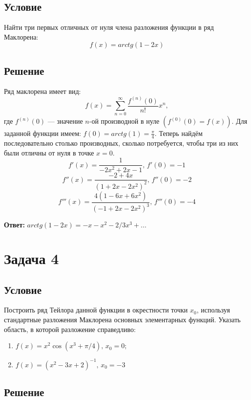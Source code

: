 \documentclass[12pt]{article}
\begin{document}
	\subsection*{Условие}
	
	Найти три первых отличных от нуля члена разложения функции в ряд Маклорена:
	$$ f(x) = arctg(1-2x) $$
	\subsection*{Решение}

	Ряд маклорена имеет вид:
	$$ f(x) = \sum_{n=0}^\infty \frac{f^{(n)}(0)}{n!} x^n ,$$
	где $ f^{(n)}(0) $ --- значение $ n $-ой производной в нуле $ (f^{(0)}(0)= f(x) )$. Для заданной функции имеем: $ f(0) = arctg(1) = \frac{\pi}{4} $. Теперь найдём последовательно столько производных, сколько потребуется, чтобы три из них были отличны от нуля в точке $ x = 0 $.
	$$ f'(x) = \frac{1}{- 2 x^2 + 2 x -1 }, \, f'(0) = - 1 $$
	$$ f''(x) = \frac{-2 + 4 x}{(1 + 2 x - 2 x^2)^2}, \, f''(0) = - 2 $$
	$$ f'''(x) = \frac{4 (1 - 6 x + 6 x^2)}{(-1 + 2 x - 2 x^2)^3}, \, f'''(0) = - 4 $$

	\hspace{200pt}\textbf{Ответ:} $ arctg(1-2x) = - x - x^2 - 2/3 x^3 + ...  $

	\newpage

	\section*{Задача 4}	
	\subsection*{Условие}

	Построить ряд Тейлора данной функции в окрестности точки $ x_0 $, используя стандартные разложения Маклорена основных элементарных функций. Указать область, в которой разложение справедливо:
	\begin{enumerate}
		\item $ f(x) = x^2 \cos{(x^3 + \pi / 4)}, \, x_0 = 0; $
		\item $ f(x) = (x^2 - 3x + 2)^{-1}, \, x_0 = -3 $
	\end{enumerate}

	\subsection*{Решение}
\end{document}
